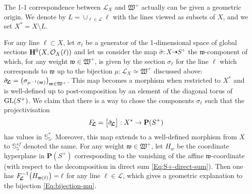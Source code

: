 \documentclass[11pt]{amsart}
\newcommand{\sk}{\smallskip}
\begin{document}
The 1-1 correspondence between $\mathcal L_X$ and $\mathfrak W^+$ actually can be given a geometric origin.  We denote by $L=\cup_{\ell \in \mathcal L} \ell $ with the lines viewed as subsets of $X$, and we set  $X^*=X\setminus L$.

For any line $\ell\subset X$, let $\sigma_\ell$ be a generator of the 1-dimensional 
space of global sections ${\bf H}^0(X, \mathcal O_X(\ell))$ and let us consider the map $\hat \sigma : X\dashrightarrow  S^+$ the $\mathfrak w$-component of which, for any weight $\mathfrak w\in \mathfrak W^+$, is given by the section $\sigma_\ell$ for the line $\ell$ which corresponds to $\mathfrak w$ up to the bijection $\mu : \mathcal L_X\simeq \mathfrak W^+$ discussed above: $\hat \sigma_{ \hspace{-0.06cm} \boldsymbol{\mathcal L} } =\big( \sigma_{\mu^{-1}(\mathfrak w)}\big)_{ \mathfrak w \in \mathfrak W^+}$. This map becomes a morphism when restricted to $X^*$ and is well-defined up to post-composition by an element of the diagonal torus of ${\rm GL}( S^+)$. We claim that there is a way to chose the components $\sigma_\ell$ such that the projectivisation 
\begin{equation}
\label{Eq:F-L}
F_{ \hspace{-0.06cm} \boldsymbol{\mathcal L} }=\big[ \hat \sigma_{ \hspace{-0.06cm} \boldsymbol{\mathcal L} } \big] : X^*\rightarrow \mathbf P(S^+)
\end{equation}%
 has values in $\mathbb S_5^*$. Moreover, this map extends to a well-defined morphism from $X$ to $\mathbb S_5^{sf}$ denoted the same.  For any weight $\mathfrak w\in \mathfrak W^+$, let $H_w$ be the coordinate hyperplane in $\mathbf P(S^+)$ corresponding to the vanishing of the affine $\mathfrak w$-coordinate 
(with respect to the decomposition in direct sum \eqref{Eq:S+-direct-sum}). Then one has $F_{ \hspace{-0.06cm} \boldsymbol{\mathcal L} }^{-1}\big( H_{\mathfrak w(\ell)}
 \big)=\ell$ for any line $\ell\in \mathcal L$, which gives a geometric explanation to the bijection 
\eqref{Eq:bijection-mu}. 
\sk 
\end{document}
